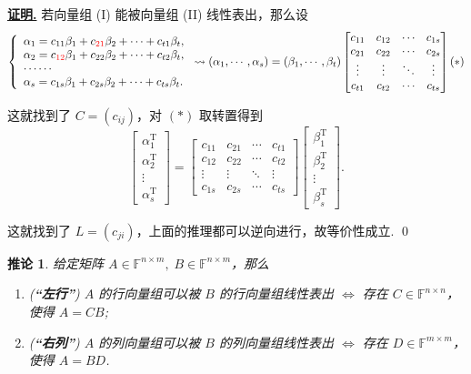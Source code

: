 \documentclass[10pt,openany]{article}
\theoremstyle{thmstyle} %
\theoremstyle{defstyle} %
\newtheorem{corollary}[theorem]{推论}
\theoremstyle{prostyle} %
\theoremstyle{exastyle}
\theoremstyle{remstyle}
\renewenvironment{proof}[1][证明]{\par\underline{\textbf{#1.}} \;\fangsong}{\qed\par}
\newcommand{\T}{^{\text{T}}}
\newcommand{\F}{\mathbb{F}}
\newcommand{\n}{^{n \times n}}
\newcommand{\nm}{^{n \times m}}
\begin{document}
\begin{proof}
    若向量组 (I) 能被向量组 (II) 线性表出，那么设
    \[ \left\{ \begin{array}{l}
    	\alpha_1=c_{11}\beta_1+c_{{\color{red} 21}}\beta_2+\cdots+c_{t1}\beta_t, \\
    	\alpha_2=c_{{\color{red} 12}}\beta_1+c_{22}\beta_2+\cdots+c_{t2}\beta_t, \\
    	\cdots\cdots \\
    	\alpha_s=c_{1s}\beta_1+c_{2s}\beta_2+\cdots+c_{ts}\beta_t.
    \end{array}\right. \leadsto (\alpha_1,\cdots,\alpha_s)=(\beta_1,\cdots,\beta_t)\begin{bmatrix}
     c_{11} & c_{12} & \cdots & c_{1s} \\
     c_{21} & c_{22} & \cdots & c_{2s} \\
     \vdots & \vdots & \ddots & \vdots \\
     c_{t1} & c_{t2} & \cdots & c_{ts}
    \end{bmatrix} (*) \]
    
    这就找到了 \( C=(c_{ij}) \)，对 \( (*) \) 取转置得到
    \[ \begin{bmatrix}
    	\alpha_1\T \\
    	\alpha_2\T \\
    	\vdots \\
    	\alpha_s\T
    \end{bmatrix}=\begin{bmatrix}
    c_{11} & c_{21} & \cdots & c_{t1} \\
    c_{12} & c_{22} & \cdots & c_{t2} \\
    \vdots & \vdots & \ddots & \vdots \\
    c_{1s} & c_{2s} & \cdots & c_{ts}
    \end{bmatrix}\begin{bmatrix}
    \beta_1\T \\
    \beta_2\T \\
    \vdots \\
    \beta_s\T
    \end{bmatrix}. \]
    
    这就找到了 \( L=(c_{ji}) \)，上面的推理都可以逆向进行，故等价性成立.
\end{proof}

\begin{corollary} \label{5.1.12}
	给定矩阵 \( A \in \F\nm, \; B \in \F\nm \)，那么
	\begin{enumerate}[(1)]
		\item ({\color{blue}\textbf{“左行”}}) \( A \) 的行向量组可以被 \( B \) 的行向量组线性表出 \( \Leftrightarrow \) 存在 \( C \in \F\n \)，使得 \( A=CB \);
		\item ({\color{blue}\textbf{“右列”}}) \( A \) 的列向量组可以被 \( B \) 的列向量组线性表出 \( \Leftrightarrow \) 存在 \( D \in \F^{m \times m} \)，使得 \( A=BD \).
	\end{enumerate}
\end{corollary}
\end{document}
